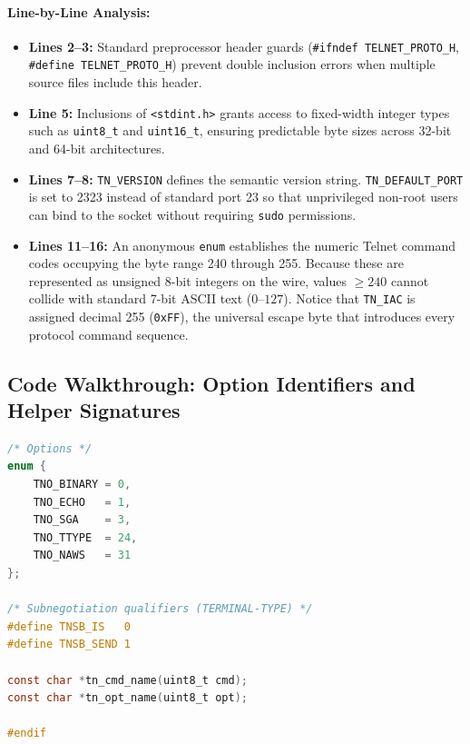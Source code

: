 \paragraph{Line-by-Line Analysis:}
\begin{itemize}[leftmargin=1.5em]
    \item \textbf{Lines 2--3:} Standard preprocessor header guards (\texttt{\#ifndef TELNET\_PROTO\_H}, \texttt{\#define TELNET\_PROTO\_H}) prevent double inclusion errors when multiple source files include this header.
    \item \textbf{Line 5:} Inclusions of \texttt{<stdint.h>} grants access to fixed-width integer types such as \texttt{uint8\_t} and \texttt{uint16\_t}, ensuring predictable byte sizes across 32-bit and 64-bit architectures.
    \item \textbf{Lines 7--8:} \texttt{TN\_VERSION} defines the semantic version string. \texttt{TN\_DEFAULT\_PORT} is set to 2323 instead of standard port 23 so that unprivileged non-root users can bind to the socket without requiring \texttt{sudo} permissions.
    \item \textbf{Lines 11--16:} An anonymous \texttt{enum} establishes the numeric Telnet command codes occupying the byte range 240 through 255. Because these are represented as unsigned 8-bit integers on the wire, values $\ge 240$ cannot collide with standard 7-bit ASCII text ($0$--$127$). Notice that \texttt{TN\_IAC} is assigned decimal 255 (\texttt{0xFF}), the universal escape byte that introduces every protocol command sequence.
\end{itemize}

\subsection{Code Walkthrough: Option Identifiers and Helper Signatures}

\begin{lstlisting}[language=C]
/* Options */
enum {
    TNO_BINARY = 0,
    TNO_ECHO   = 1,
    TNO_SGA    = 3,
    TNO_TTYPE  = 24,
    TNO_NAWS   = 31
};

/* Subnegotiation qualifiers (TERMINAL-TYPE) */
#define TNSB_IS   0
#define TNSB_SEND 1

const char *tn_cmd_name(uint8_t cmd);
const char *tn_opt_name(uint8_t opt);

#endif
\end{lstlisting}

